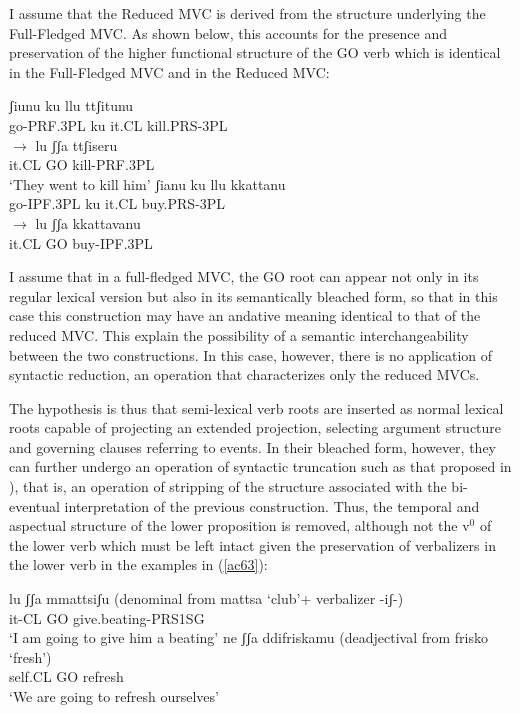 \documentclass[output=paper]{langscibook}
\begin{document}
I assume that the Reduced MVC is derived from the structure underlying the Full-Fledged MVC. As shown below, this accounts for the presence and preservation of the higher functional structure of the GO verb which is identical in the Full-Fledged MVC and in the Reduced MVC:

\ea \label{ac62}
    \ea \label{ac62a}
        \ea\label{ac62ai}\gll ʃiunu ku llu ttʃitunu\\
        go-PRF.3PL ku it.CL kill.PRS-3PL\\
        \ex \label{ac62aii}$\rightarrow$ \gll lu    ʃʃa   ttʃiseru\\
        it.CL  GO  kill-PRF.3PL\\
        \glt ‘They went to kill him’
        \z
    \ex\label{ac62b}
        \ea \label{ac62bi}\gll ʃianu ku  llu kkattanu\\
        go-IPF.3PL ku it.CL buy.PRS-3PL\\
        \ex \label{ac62bii}$\rightarrow$ \gll lu ʃʃa  kkattavanu\\
        it.CL GO  buy-IPF.3PL\\
        \z
    \z
\z

I assume that in a full-fledged MVC, the GO root can appear not only in its regular lexical version but also in its semantically bleached form, so that in this case this construction may have an andative meaning identical to that of the reduced MVC. This explain the possibility of a semantic interchangeability between the two constructions. In this case, however, there is no application of syntactic reduction, an operation that characterizes only the reduced MVCs.

The hypothesis is thus that semi-lexical verb roots are inserted as normal lexical roots capable of projecting an extended projection, selecting argument structure and governing clauses referring to events.  In their bleached form, however, they can further undergo an operation of syntactic truncation such as that proposed in \cite{wurmbrand2014a, wurmbrand2015, wurmbrand2017verb}), that is, an operation of stripping of the structure associated with the bi-eventual interpretation of the previous construction. Thus, the temporal and aspectual structure of the lower proposition is removed, although not the v$^0$ of the lower verb which must be left intact given the preservation of verbalizers in the lower verb in the examples in (\ref{ac63}):

\ea \label{ac63}
    \ea \label{ac63a}\gll lu     ʃʃa  mmattsiʃu  (denominal from mattsa ‘club’+ verbalizer -iʃ-)\\
 it-CL GO  give.beating-PRS1SG\\
 \glt ‘I am going to give him a beating’
    \ex \label{ac63b}\gll ne    ʃʃa   ddifriskamu (deadjectival from frisko ‘fresh’)\\
 self.CL  GO  refresh\\
 \glt ‘We are going to refresh ourselves’
    \z
\z
\end{document}
